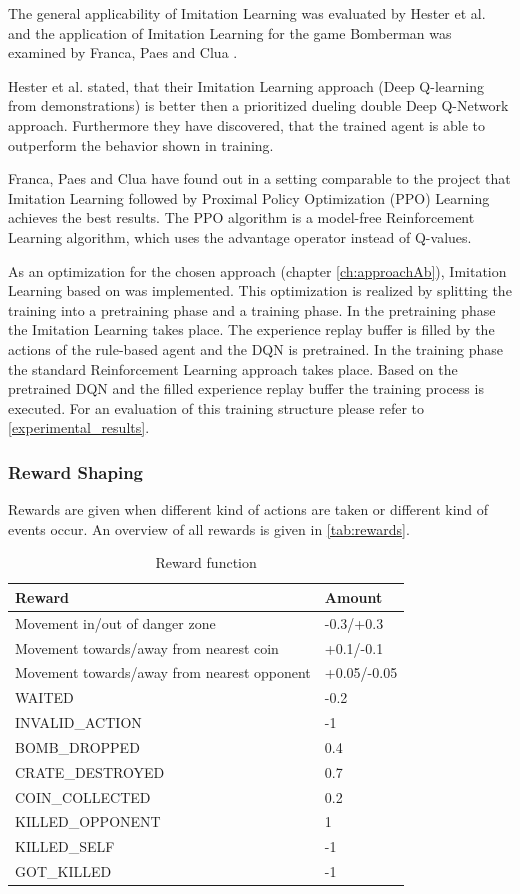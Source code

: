 The general applicability of Imitation Learning was evaluated by Hester et al. \cite{hester2017deep} and the application of Imitation Learning for the game Bomberman was examined by Franca, Paes and Clua \cite{Franca2019}.

Hester et al. \cite{hester2017deep} stated, that their Imitation Learning approach (Deep Q-learning from demonstrations) is better then a prioritized dueling double Deep Q-Network approach. Furthermore they have discovered, that the trained agent is able to outperform the behavior shown in training.

Franca, Paes and Clua \cite{Franca2019} have found out in a setting comparable to the project that Imitation Learning followed by Proximal Policy Optimization (PPO) Learning achieves the best results. The PPO algorithm is a model-free Reinforcement Learning algorithm, which uses the advantage operator instead of Q-values.

As an optimization for the chosen approach (chapter \ref{ch:approachAb}), Imitation Learning based on \cite{hester2017deep} was implemented. This optimization is realized by splitting the training into a pretraining phase and a training phase. In the pretraining phase the Imitation Learning takes place. The experience replay buffer is filled by the actions of the rule-based agent and the DQN is pretrained.
In the training phase the standard Reinforcement Learning approach takes place. Based on the pretrained DQN and the filled experience replay buffer the training process is executed. For an evaluation of this training structure please refer to \autoref{experimental_results}.

\subsubsection{Reward Shaping}
\label{ch:approachBd}

Rewards are given when different kind of actions are taken or different kind of events occur. An overview of all rewards is given in \autoref{tab:rewards}.

\begin{table}[hbt!]
	\caption{Reward function}
	\label{tab:rewards}
	\begin{tabular}{p{}|p{}}
		\textbf{Reward} & \textbf{Amount} \\
		\hline
		\hline
		Movement in/out of danger zone & -0.3/+0.3 \\
		Movement towards/away from nearest coin & +0.1/-0.1 \\
		Movement towards/away from nearest opponent & +0.05/-0.05 \\
		WAITED & -0.2 \\
		INVALID\_ACTION & -1 \\
		BOMB\_DROPPED & 0.4 \\
		CRATE\_DESTROYED & 0.7 \\
		COIN\_COLLECTED & 0.2 \\
		KILLED\_OPPONENT & 1 \\
		KILLED\_SELF & -1 \\
		GOT\_KILLED & -1 \\
	\end{tabular}
\end{table}

